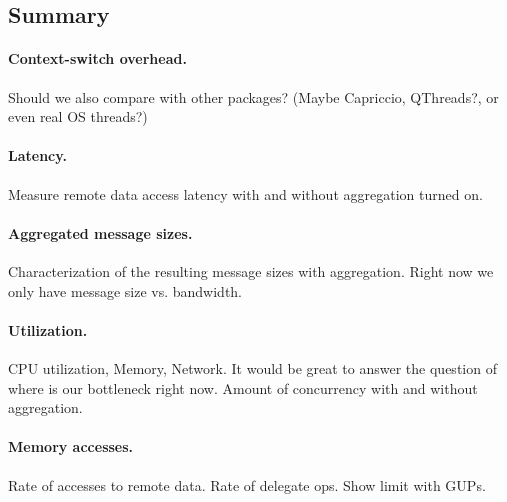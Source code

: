 {\subsection{Summary}

\paragraph{Context-switch overhead.} Should we also compare with other packages? (Maybe Capriccio, QThreads?, or even real OS threads?)

\paragraph{Latency.} Measure remote data access latency with and without aggregation turned on.

\paragraph{Aggregated message sizes.} Characterization of the resulting message sizes with aggregation. Right now we only have message size vs. bandwidth.

\paragraph{Utilization.} CPU utilization, Memory, Network. It would be great to answer the question of where is our bottleneck right now. Amount of concurrency with and without aggregation. 

\paragraph{Memory accesses.} Rate of accesses to remote data. Rate of delegate ops. Show limit with GUPs.





}

